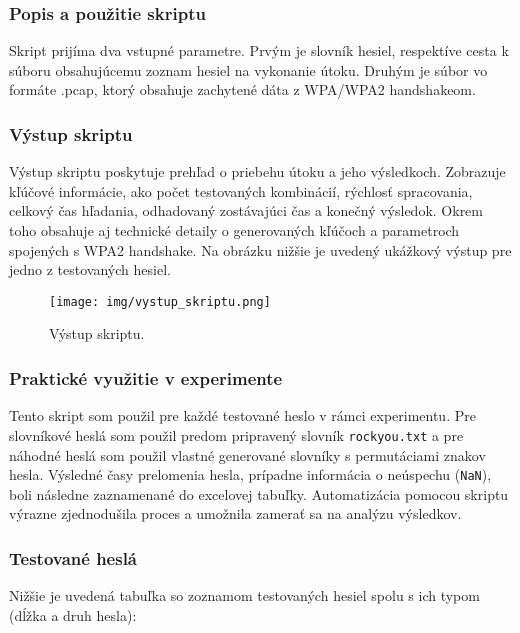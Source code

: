 \documentclass[12pt, twoside]{book}
\begin{document}
\subsubsection{Popis a použitie skriptu} 
Skript prijíma dva vstupné parametre. Prvým je slovník hesiel, respektíve cesta k súboru obsahujúcemu zoznam hesiel na vykonanie útoku. Druhým je súbor vo formáte .pcap, ktorý obsahuje zachytené dáta z WPA/WPA2 handshakeom. 


\subsubsection{Výstup skriptu} 
Výstup skriptu poskytuje prehľad o priebehu útoku a jeho výsledkoch. Zobrazuje kľúčové informácie, ako počet testovaných kombinácií, rýchlosť spracovania, celkový čas hľadania, odhadovaný zostávajúci čas a konečný výsledok. Okrem toho obsahuje aj technické detaily o generovaných kľúčoch a parametroch spojených s WPA2 handshake. Na obrázku nižšie je uvedený ukážkový výstup pre jedno z testovaných hesiel.

\begin{figure}[H] 
    \centering
    \texttt{[image: img/vystup\_skriptu.png]}
    \caption{Výstup skriptu.}
    \label{fig:vystup_skriptu}
\end{figure}

\subsubsection{Praktické využitie v experimente} 
Tento skript som použil pre každé testované heslo v rámci experimentu. Pre slovníkové heslá som použil predom pripravený slovník \texttt{rockyou.txt} a pre náhodné heslá som použil vlastné generované slovníky s permutáciami znakov hesla. Výsledné časy prelomenia hesla, prípadne informácia o neúspechu (\texttt{NaN}), boli následne zaznamenané do excelovej tabuľky. Automatizácia pomocou skriptu výrazne zjednodušila proces a umožnila zamerať sa na analýzu výsledkov.

\subsubsection{Testované heslá} 
Nižšie je uvedená tabuľka so zoznamom testovaných hesiel spolu s ich typom (dĺžka a druh hesla):
\end{document}

